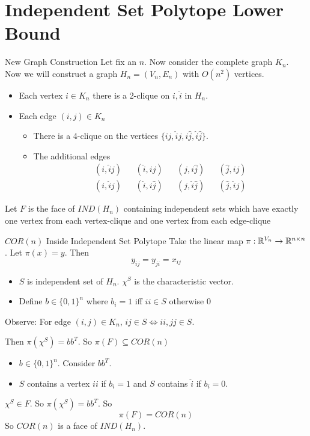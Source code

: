 \documentclass[aspectratio=1610, handout]{beamer}
\begin{document}
\section{Independent Set Polytope Lower Bound}
\begin{frame}{New Graph Construction}
	Let fix an $n$. Now consider the complete graph $K_n$. Now we will construct a graph $H_n=(V_n,E_n)$ with $O(n^2)$ vertices.\pause
	
	\begin{itemize}
		\item Each vertex $i\in K_n$ there is a 2-clique on $i,\hat{i}$ in $H_n$.\pause
		
		\item Each edge $(i,j)\in K_n$ \begin{itemize}
			\item There is a 4-clique on the vertices $\{ij,\hat{i}j,i\hat{j},\hat{i}\hat{j}\}$.
			\item The additional edges\begin{align*}
				(i,\hat{i}j)  && (\hat{i},ij) && (j,i\hat{j}) && (\hat{j}, ij)\\
				(i,\hat{i}\hat{j}) && (\hat{i},i\hat{j}) && (j,\hat{i}\hat{j}) && (\hat{j},\hat{i}j)
			\end{align*}
		\end{itemize}
	\end{itemize}\pause

	Let $F$ is the face of $IND(H_n)$ containing independent sets which have exactly one vertex from each vertex-clique and one vertex from each edge-clique
\end{frame}
\begin{frame}{$COR(n)$ Inside  Independent Set Polytope}
	Take the linear map $\pi:\mathbb{R}^{V_n}\to \mathbb{R}^{n\times n}$. Let $\pi(x)=y$. Then $$y_{ij}=y_{ji}=x_{ij}$$\pause
	\begin{itemize}
		\item $S$ is independent set of $H_n$. $\chi^S$ is the characteristic vector.\pause
		
		\item Define $b\in \{0,1\}^n$ where $b_i=1$ iff $ii\in S$ otherwise $0$
	\end{itemize}\pause

	Observe: For edge $(i,j)\in K_n$, $ij\in S\iff ii,jj\in S$.

	Then $\pi(\chi^S)=bb^T$. So $\pi(F)\subseteq COR(n)$\pause

	\begin{itemize}
		\item $b\in\{0,1\}^n$. Consider $bb^T$. \pause
		
		\item $S$ contains a vertex $ii$ if $b_i=1$ and $S$ contains $\hat{i}$ if $b_i=0$.
	\end{itemize} \pause

	$\chi^S\in F$. So $\pi(\chi^S)=bb^T$. So $$\pi(F)=COR(n)$$ So $COR(n)$ is a face of $IND(H_n)$.
\end{frame}
\end{document}
